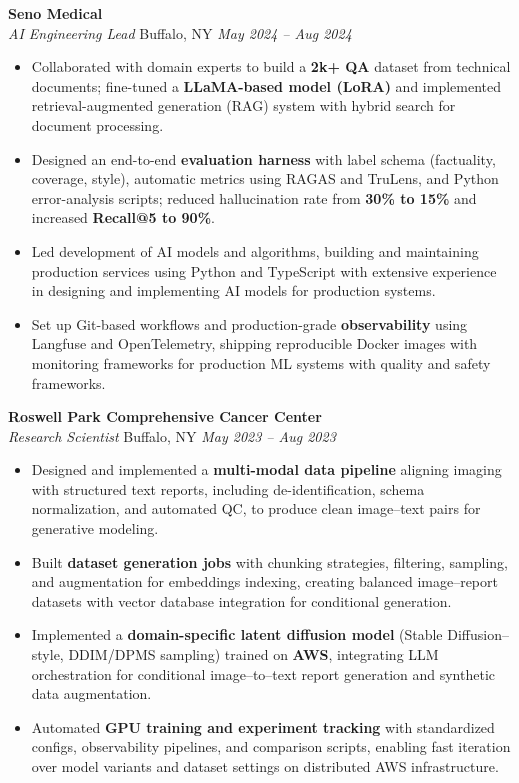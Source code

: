 \vspace*{-1pt}
\item \textbf{Seno Medical}\\
\textit{AI Engineering Lead} \hfill Buffalo, NY \quad \textit{May 2024 -- Aug 2024}
\vspace*{-3pt}
\begin{itemize}[leftmargin=0.2in, topsep=1pt]
  \item Collaborated with domain experts to build a \textbf{2k+ QA} dataset from technical documents; fine-tuned a \textbf{LLaMA-based model (LoRA)} and implemented retrieval-augmented generation (RAG) system with hybrid search for document processing.
  \item Designed an end-to-end \textbf{evaluation harness} with label schema (factuality, coverage, style), automatic metrics using RAGAS and TruLens, and Python error-analysis scripts; reduced hallucination rate from \textbf{30\% to 15\%} and increased \textbf{Recall@5 to 90\%}.
  \item Led development of AI models and algorithms, building and maintaining production services using Python and TypeScript with extensive experience in designing and implementing AI models for production systems.
  \item Set up Git-based workflows and production-grade \textbf{observability} using Langfuse and OpenTelemetry, shipping reproducible Docker images with monitoring frameworks for production ML systems with quality and safety frameworks.
\end{itemize}

\vspace*{-1pt}
\item \textbf{Roswell Park Comprehensive Cancer Center}\\
\textit{Research Scientist} \hfill Buffalo, NY \quad \textit{May 2023 -- Aug 2023}
\vspace*{-3pt}
\begin{itemize}[leftmargin=0.2in, topsep=1pt]
  \item Designed and implemented a \textbf{multi-modal data pipeline} aligning imaging with structured text reports, including de-identification, schema normalization, and automated QC, to produce clean image–text pairs for generative modeling.
  \item Built \textbf{dataset generation jobs} with chunking strategies, filtering, sampling, and augmentation for embeddings indexing, creating balanced image–report datasets with vector database integration for conditional generation.
  \item Implemented a \textbf{domain-specific latent diffusion model} (Stable Diffusion–style, DDIM/DPMS sampling) trained on \textbf{AWS}, integrating LLM orchestration for conditional image–to–text report generation and synthetic data augmentation.
  \item Automated \textbf{GPU training and experiment tracking} with standardized configs, observability pipelines, and comparison scripts, enabling fast iteration over model variants and dataset settings on distributed AWS infrastructure.
\end{itemize}
